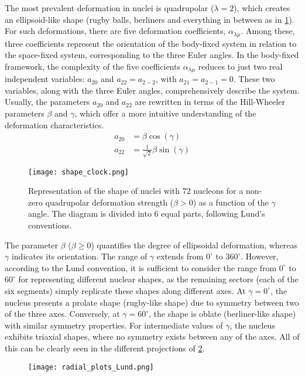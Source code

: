 The most prevalent deformation in nuclei is quadrupolar ($\lambda= 2$), which creates an ellipsoid-like shape (rugby balls, berliners and everything in between as in \cref{fig:intro:shapeclock}). For such deformations, there are five deformation coefficients, $\alpha_{\lambda\mu}$. Among these, three coefficients represent the orientation of the body-fixed system in relation to the space-fixed system, corresponding to the three Euler angles. 
\newpar
In the body-fixed framework, the complexity of the five coefficients $\alpha_{\lambda\mu}$ reduces to just two real independent variables: $a_{20}$ and $a_{22} = a_{2-2}$, with $a_{21} = a_{2-1} = 0$. These two variables, along with the three Euler angles, comprehensively describe the system. Usually, the parameters $a_{20}$ and $a_{22}$ are rewritten in terms of the Hill-Wheeler parameters $\beta$ and $\gamma$, which offer a more intuitive understanding of the deformation characteristics.
\begin{align}
    a_{20} &= \beta \cos\left(\gamma\right)\\
    a_{22} &= \frac{1}{\sqrt{2}}\beta \sin\left(\gamma\right)
\end{align}
\begin{figure}[hbt]
    \centering
    \texttt{[image: shape\_clock.png]}
    \caption{Representation of the shape of nuclei with $72$ nucleons for a non-zero quadrupolar deformation strength ($\beta > 0$) as a function of the $\gamma$ angle. The diagram is divided into $6$ equal parts, following Lund's conventions.}
    \label{fig:intro:shapeclock}
\end{figure}

The parameter $\beta$ ($\beta \geq 0$) quantifies the degree of ellipsoidal deformation, whereas $\gamma$ indicates its orientation. The range of $\gamma$ extends from $0^\circ$ to $360^\circ$. However, according to the Lund convention, it is sufficient to consider the range from $0^\circ$ to $60^\circ$ for representing different nuclear shapes, as the remaining sectors (each of the six segments) simply replicate these shapes along different axes.
\newpar
At $\gamma=0^\circ$, the nucleus presents a prolate shape (rugby-like shape) due to symmetry between two of the three axes. Conversely, at $\gamma=60^\circ$, the shape is oblate (berliner-like shape) with similar symmetry properties. 
For intermediate values of $\gamma$, the nucleus exhibits triaxial shapes, where no symmetry exists between any of the axes. All of this can be clearly seen in the different projections of \cref{fig:intro:lund}.
\begin{figure}[hbt]
    \centering
    \texttt{[image: radial\_plots\_Lund.png]}
    \label{fig:intro:lund}
\end{figure}

